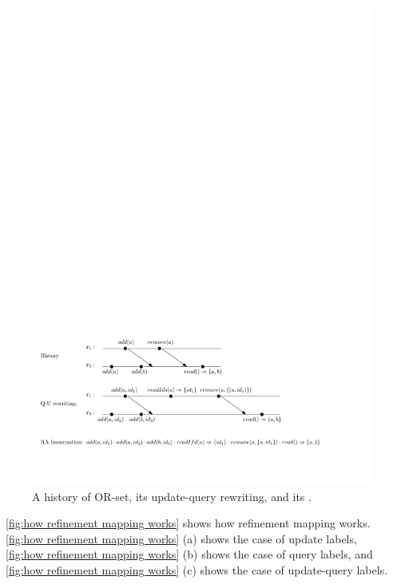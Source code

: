 \begin{figure}[t]
  \centering
  \includegraphics[width=0.8 \textwidth]{figures/ORSetHisRewritingandLin.pdf}
\vspace{-10pt}
  \caption{A history of OR-set, its update-query rewriting, and its \crdtlinearization{}.}
  \label{fig:a history of OR-set, its update-query rewriting, and its RA-linearization}
\end{figure}


\figurename~\ref{fig:how refinement mapping works} shows how refinement mapping works. \figurename~\ref{fig:how refinement mapping works} (a) shows the case of update labels, \figurename~\ref{fig:how refinement mapping works} (b) shows the case of query labels, and \figurename~\ref{fig:how refinement mapping works} (c) shows the case of update-query labels. 

